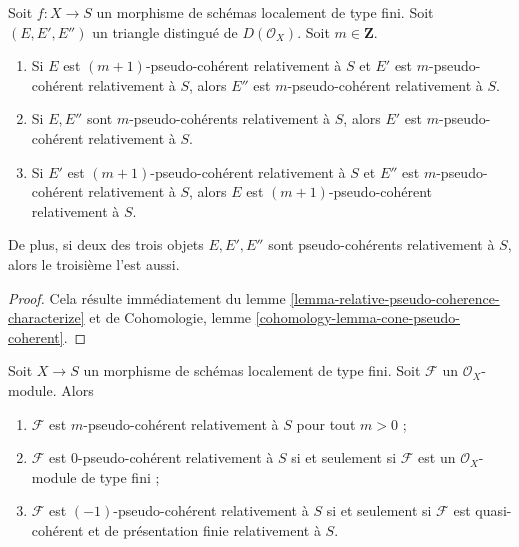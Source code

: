 \begin{lemma}
\label{lemma-cone-relatively-pseudo-coherent}
Soit $f : X \to S$ un morphisme de schémas localement de type fini.
Soit $(E, E', E'')$ un triangle distingué de
$D(\mathcal{O}_X)$. Soit $m \in \mathbf{Z}$.
\begin{enumerate}
\item Si $E$ est $(m + 1)$-pseudo-cohérent relativement à $S$ et
$E'$ est $m$-pseudo-cohérent relativement à $S$, alors $E''$ est
$m$-pseudo-cohérent relativement à $S$.
\item Si $E, E''$ sont $m$-pseudo-cohérents relativement à $S$,
alors $E'$ est $m$-pseudo-cohérent relativement à $S$.
\item Si $E'$ est $(m + 1)$-pseudo-cohérent relativement à $S$
et $E''$ est $m$-pseudo-cohérent relativement à $S$, alors
$E$ est $(m + 1)$-pseudo-cohérent relativement à $S$.
\end{enumerate}
De plus, si deux des trois objets $E, E', E''$ sont pseudo-cohérents
relativement à $S$, alors le troisième l'est aussi.
\end{lemma}

\begin{proof}
Cela résulte immédiatement du lemme \ref{lemma-relative-pseudo-coherence-characterize} et de
Cohomologie, lemme \ref{cohomology-lemma-cone-pseudo-coherent}.
\end{proof}

\begin{lemma}
\label{lemma-rel-n-pseudo-module}
Soit $X \to S$ un morphisme de schémas localement de type fini.
Soit $\mathcal{F}$ un $\mathcal{O}_X$-module. Alors
\begin{enumerate}
\item $\mathcal{F}$ est $m$-pseudo-cohérent relativement à $S$ pour tout $m > 0$ ;
\item $\mathcal{F}$ est $0$-pseudo-cohérent relativement à $S$ si et seulement si
$\mathcal{F}$ est un $\mathcal{O}_X$-module de type fini ;
\item $\mathcal{F}$ est $(-1)$-pseudo-cohérent relativement à $S$ si et seulement si
$\mathcal{F}$ est quasi-cohérent et de présentation finie relativement à $S$.
\end{enumerate}
\end{lemma}

